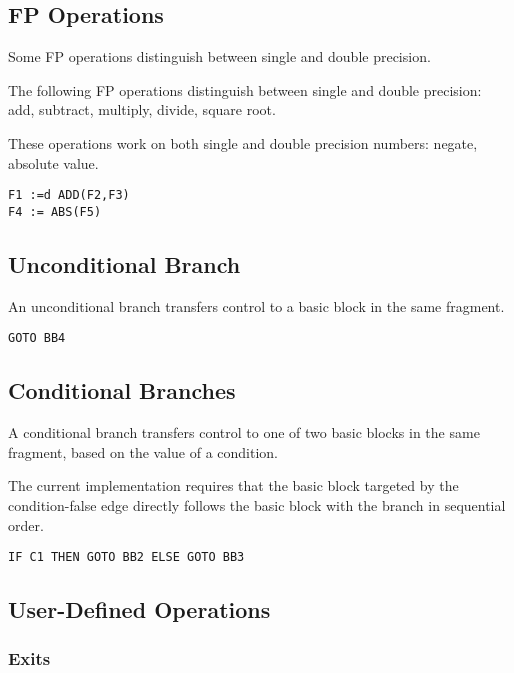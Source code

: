 \documentclass{article}
\begin{document}
\subsection{FP Operations}

Some FP operations distinguish between single and double precision.

The following FP operations distinguish between single and double
precision: add, subtract, multiply, divide, square root.

These operations work on both single and double precision numbers:
negate, absolute value.

\begin{verbatim}
F1 :=d ADD(F2,F3)
F4 := ABS(F5)
\end{verbatim}

\subsection{Unconditional Branch}

An unconditional branch transfers control to a basic block in the same
fragment.

\begin{verbatim}
GOTO BB4
\end{verbatim}

\subsection{Conditional Branches}

A conditional branch transfers control to one of two basic blocks in
the same fragment, based on the value of a condition.

The current implementation requires that the basic block targeted by
the condition-false edge directly follows the basic block with the
branch in sequential order.

\begin{verbatim}
IF C1 THEN GOTO BB2 ELSE GOTO BB3
\end{verbatim}

\subsection{User-Defined Operations}

\subsubsection{Exits}
\end{document}
